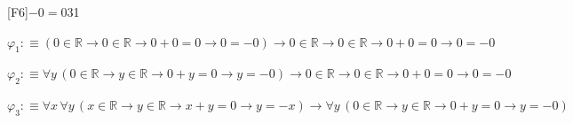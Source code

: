 \begin{fullproof}{[F6]}{$-0 = 0$}{31}
\begin{ptree}
\noLine
{}
\end{ptree}
\begin{abbrevlist}
\item $\varphi_{1} :\equiv (0 \in \mathbb{R} \to 0 \in \mathbb{R} \to 0 + 0 = 0 \to 0 = -0) \to 0 \in \mathbb{R} \to 0 \in \mathbb{R} \to 0 + 0 = 0 \to 0 = -0$
\item $\varphi_{2} :\equiv \forall y\,(0 \in \mathbb{R} \to y \in \mathbb{R} \to 0 + y = 0 \to y = -0) \to 0 \in \mathbb{R} \to 0 \in \mathbb{R} \to 0 + 0 = 0 \to 0 = -0$
\item $\varphi_{3} :\equiv \forall x\,\forall y\,(x \in \mathbb{R} \to y \in \mathbb{R} \to x + y = 0 \to y = -x) \to \forall y\,(0 \in \mathbb{R} \to y \in \mathbb{R} \to 0 + y = 0 \to y = -0)$
\end{abbrevlist}
\end{fullproof}
